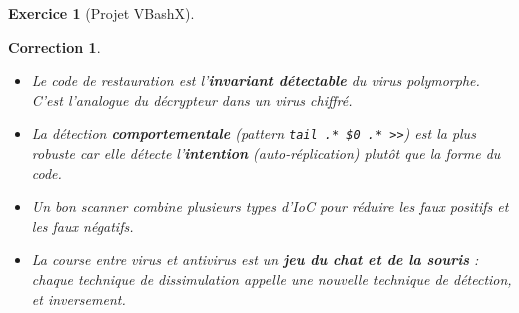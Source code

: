 \documentclass[a4paper,11pt]{article}
\theoremstyle{plain}
\newtheorem{correction}{Correction}
\theoremstyle{definition}
\newtheorem{exercice}{Exercice}
\begin{document}
\begin{exercice}[Projet VBashX]
\begin{correction}
\begin{pointcle}
\begin{itemize}
    \item Le code de restauration est l'\textbf{invariant détectable} du virus polymorphe. C'est l'analogue du \textit{décrypteur} dans un virus chiffré.
    \item La détection \textbf{comportementale} (pattern \texttt{tail .* \$0 .* >>}) est la plus robuste car elle détecte l'\textbf{intention} (auto-réplication) plutôt que la forme du code.
    \item Un bon scanner combine plusieurs types d'IoC pour réduire les faux positifs et les faux négatifs.
    \item La course entre virus et antivirus est un \textbf{jeu du chat et de la souris} : chaque technique de dissimulation appelle une nouvelle technique de détection, et inversement.
\end{itemize}
\end{pointcle}

\end{correction}

\end{exercice}
\end{document}
